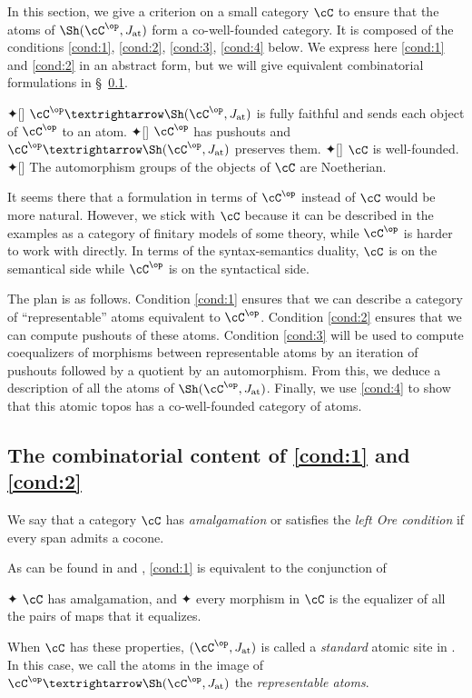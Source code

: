 \documentclass[numberwithin=section]{papier}
\newcommand{\at}{\mathrm{at}}
\begin{document}
In this section, we give a criterion on a small category $\cC$ to ensure that the atoms of $\Sh(\cC^\op,J_\at)$ form a co-well-founded category. It is composed of the conditions \ref{cond:1}, \ref{cond:2}, \ref{cond:3}, \ref{cond:4} below. We express here \ref{cond:1} and \ref{cond:2} in an abstract form, but we will give equivalent combinatorial formulations in §~\ref{subsec:combinatorial-content}.
\begin{itemize}
	✦[] $\cC^\op → \Sh(\cC^\op,J_{\at})$ is fully faithful and sends each object of $\cC^\op$ to an atom.
	✦[] $\cC^\op$ has pushouts and $\cC^\op → \Sh(\cC^\op,J_{\at})$ preserves them.
	✦[] $\cC$ is well-founded.
	✦[] The automorphism groups of the objects of $\cC$ are Noetherian.
\end{itemize}
It seems there that a formulation in terms of $\cC^\op$ instead of $\cC$ would be more natural. However, we stick with $\cC$ because it can be described in the examples as a category of finitary models of some theory, while $\cC^\op$ is harder to work with directly. In terms of the syntax-semantics duality, $\cC$ is on the semantical side while $\cC^\op$ is on the syntactical side. %

The plan is as follows. Condition \ref{cond:1} ensures that we can describe a category of ``representable'' atoms equivalent to $\cC^\op$. Condition \ref{cond:2} ensures that we can compute pushouts of these atoms. Condition \ref{cond:3} will be used to compute coequalizers of morphisms between representable atoms by an iteration of pushouts followed by a quotient by an automorphism. From this, we deduce a description of all the atoms of $\Sh(\cC^\op,J_\at)$. Finally, we use \ref{cond:4} to show that this atomic topos has a co-well-founded category of atoms.

\subsection[The combinatorial content of (C1) and (C2)]{The combinatorial content of \ref{cond:1} and \ref{cond:2}}
\label{subsec:combinatorial-content}

We say that a category $\cC$ has \emph{amalgamation} or satisfies the \emph{left Ore condition} if every span admits a cocone.

As can be found in \cite[Sec.~7(3)]{AtomicToposesBarDia1980} and \cite[C2.1.12(c)]{johnstoneSketchesElephantTopos2002}, \ref{cond:1} is equivalent to the conjunction of
\begin{enumerate}
	✦ $\cC$ has amalgamation, and
	✦ every morphism in $\cC$ is the equalizer of all the pairs of maps that it equalizes.
\end{enumerate}
When $\cC$ has these properties, $(\cC^\op,J_\at)$ is called a \emph{standard} atomic site in \cite{AtomicToposesBarDia1980}. In this case, we call the atoms in the image of $\cC^\op → \Sh(\cC^\op,J_\at)$ the \emph{representable atoms}.
\end{document}
